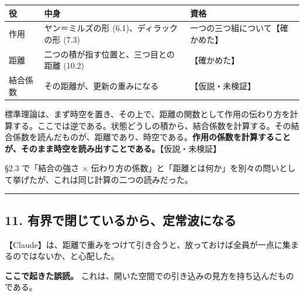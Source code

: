 \documentclass[
  a4paper,
]{ltjsarticle}
\newcounter{none} %
\begin{document}
{\def\LTcaptype{none} %
\begin{longtable}[]{@{}
  >{\raggedright\arraybackslash}p{}
  >{\raggedright\arraybackslash}p{}
  >{\raggedright\arraybackslash}p{}@{}}
\toprule\noalign{}
\begin{minipage}[b]{\linewidth}\raggedright
役
\end{minipage} & \begin{minipage}[b]{\linewidth}\raggedright
中身
\end{minipage} & \begin{minipage}[b]{\linewidth}\raggedright
資格
\end{minipage} \\
\midrule\noalign{}
\endhead
\bottomrule\noalign{}
\endlastfoot
作用 & ヤン＝ミルズの形 (6.1)、ディラックの形 (7.3) &
一つの三つ組について【確かめた】 \\
距離 & 二つの積が指す位置と、三つ目との距離 (10.2) & 【確かめた】 \\
結合係数 & その距離が、更新の重みになる & 【仮説・未検証】 \\
\end{longtable}
}

標準理論は、まず時空を置き、その上で、距離の関数として作用の伝わり方を計算する。ここでは逆である。状態どうしの積から、結合係数を計算する。その結合係数を読んだものが、距離であり、時空である。\textbf{作用の係数を計算することが、そのまま時空を読み出すことである。}【仮説・未検証】

§2.3 で「結合の強さ ×
伝わり方の係数」と「距離とは何か」を別々の問いとして挙げたが、これは同じ計算の二つの読みだった。

\begin{center}\rule{0.5\linewidth}{0.5pt}\end{center}

\subsection{11.
有界で閉じているから、定常波になる}\label{ux6709ux754cux3067ux9589ux3058ux3066ux3044ux308bux304bux3089ux5b9aux5e38ux6ce2ux306bux306aux308b}

【Claude】は、距離で重みをつけて引き合うと、放っておけば全員が一点に集まるのではないか、と心配した。

\textbf{ここで起きた誤読。}
これは、開いた空間での引き込みの見方を持ち込んだものである。
\end{document}
